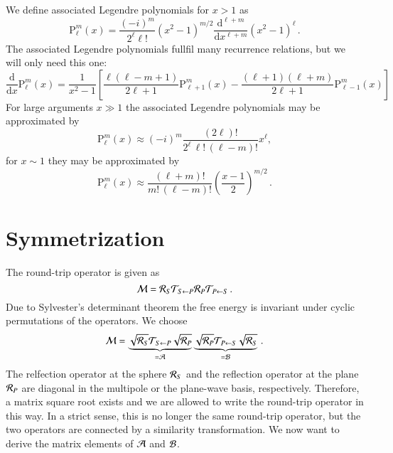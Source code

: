 \documentclass[superscriptaddress,prb]{revtex4-1}
\newcommand{\imag}{i} %
\newcommand{\Plm}[2]{{\text{P}_{#1}^{#2}}}
\begin{document}
We define associated Legendre polynomials for $x>1$ as
\begin{equation}
\Plm{\ell}{m}(x) = \frac{(-\imag)^m}{2^\ell \ell!} \left(x^2-1\right)^{m/2} \frac{\mathrm{d}^{\ell+m}}{\mathrm{d}x^{\ell+m}} \left(x^2-1\right)^\ell \,.
\end{equation}
The associated Legendre polynomials fullfil many recurrence relations, but we will only need this one:
\begin{equation}
\label{appendix:dPlm}
\frac{\mathrm{d}}{\mathrm{d}x} \Plm{\ell}{m}(x) = \frac{1}{x^2-1} \left[
\frac{\ell(\ell-m+1)}{2\ell+1} \Plm{\ell+1}{m}(x)
-\frac{(\ell+1)(\ell+m)}{2\ell+1} \Plm{\ell-1}{m}(x)
\right]
\end{equation}
For large arguments $x\gg 1$ the associated Legendre polynomials may be approximated by
\begin{equation}
\label{appendix:Plm_gg}
\Plm{\ell}{m}(x) \approx (-\imag)^m \frac{(2\ell)!}{2^\ell \, \ell! \, (\ell-m)!} x^\ell,
\end{equation}
for $x\sim1$ they may be approximated by
\begin{equation}
\label{appendix:Plm_1}
\Plm{\ell}{m}(x) \approx \frac{(\ell+m)!}{m! \, (\ell-m)!} \left(\frac{x-1}{2}\right)^{m/2} \,.
\end{equation}

\newpage

\section{Symmetrization}

The round-trip operator is given as
\begin{equation}
{\cal M} = {\cal R}_S {\cal T}_{S\leftarrow P} {\cal R}_P {\cal T}_{P\leftarrow S} \,.
\end{equation}
Due to Sylvester's determinant theorem the free energy is invariant under
cyclic permutations of the operators. We choose
\begin{equation}
{\cal M} = \underbrace{\sqrt{{\cal R}_S} {\cal T}_{S\leftarrow P} \sqrt{{\cal R}_P}}_{=\cal A} \underbrace{\sqrt{{\cal R}_P} {\cal T}_{P\leftarrow S} \sqrt{{\cal R}_S}}_{=\cal B} \,.
\end{equation}
The relfection operator at the sphere ${\cal R}_S$ and the reflection operator
at the plane ${\cal R}_P$ are diagonal in the multipole or the plane-wave
basis, respectively. Therefore, a matrix square root exists and we are allowed
to write the round-trip operator in this way. In a strict sense, this is no
longer the same round-trip operator, but the two operators are connected by a
similarity transformation.
We now want to derive the matrix elements of $\cal A$ and $\cal B$.
\end{document}
